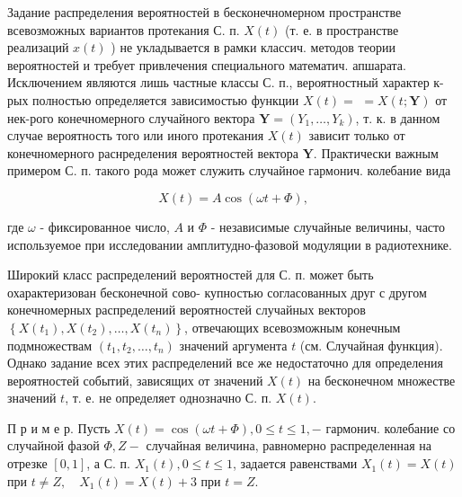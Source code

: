 \documentclass[10pt]{article}
\begin{document}
Задание распределения вероятностей в бесконечномерном пространстве всевозможных вариантов протекания С. п. $X(t)$ (т. е. в пространстве реализаций $x(t)$ ) не укладывается в рамки классич. методов теории вероятностей и требует привлечения специального математич. апшарата. Исключением являются лишь частные классы С. п., вероятностный характер к-рых полностью определяется зависимостью функции $X(t)=$ $=X(t ; \boldsymbol{Y})$ от нек-рого конечномерного случайного вектора $\boldsymbol{Y}=\left(Y_{1}, \ldots, Y_{k}\right)$, т. к. в данном случае вероятность того или иного протекания $X(t)$ зависит только от конечномерного раснределения вероятностей вектора $\boldsymbol{Y}$. Практически важным примером С. п. такого рода может служить случайное гармонич. колебание вида



\[

X(t)=A \cos (\omega t+\Phi),

\]



где $\omega$ - фиксированное число, $A$ и $\Phi$ - независимые случайные величины, часто используемое при исследовании амплитудно-фазовой модуляции в радиотехнике.



Широкий класс распределений вероятностей для С. п. может быть охарактеризован бесконечной сово- купностью согласованных друг с другом конечномерных распределений вероятностей случайных векторов $\left\{X\left(t_{1}\right), X\left(t_{2}\right), \ldots, X\left(t_{n}\right)\right\}$, отвечающих всевозможным конечным подмножествам $\left(t_{1}, t_{2}, \ldots, t_{n}\right)$ значений аргумента $t$ (см. Случайная функция). Однако задание всех этих распределений все же недостаточно для определения вероятностей событий, зависящих от значений $X(t)$ на бесконечном множестве значений $t$, т. е. не определяет однозначно С. п. $X(t)$.



П р и м е р. Пусть $X(t)=\cos (\omega t+\Phi), 0 \leqslant t \leqslant 1,-$ гармонич. колебание со случайной фазой $\Phi, Z-$ случайная величина, равномерно распределенная на отрезке $[0,1]$, а С. п. $X_{1}(t), 0 \leqslant t \leqslant 1$, задается равенствами $X_{1}(t)=X(t)$ при $t \neq Z, \quad X_{1}(t)=X(t)+3$ при $t=Z$.
\end{document}
